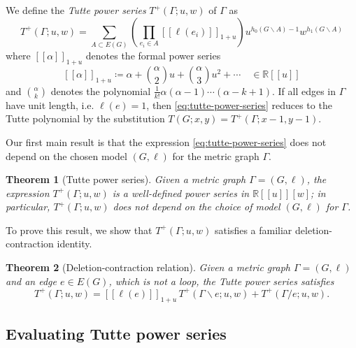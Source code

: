 \documentclass{amsart}
\newtheorem{thm}{Theorem}
\theoremstyle{definition}
\newcommand{\RR}{\mathbb{R}}
\newcommand{\fanalog}[2]{[\![#2]\!]_{#1}}
\begin{document}
We define the {\em Tutte power series}
$T^+(\Gamma; u,w)$ %
of $\Gamma$ as
\begin{equation}
\label{eq:tutte-power-series}
	T^+(\Gamma; u,w) = \sum_{A \subset E(G)} \left( \prod_{e_i \in A} \fanalog{1 + u}{\ell(e_i)} \right)
	u^{h_0(G\backslash A) - 1}w^{h_1(G\backslash A)} 
\end{equation}
where $\fanalog{1 + u}{\alpha}$ denotes the formal power series  
\begin{equation}\label{eq:f-analog}
	\fanalog{1 + u}{\alpha} \coloneq \alpha + \binom{\alpha}{2} u + \binom{\alpha}{3} u^2 + \cdots
	\quad \in \RR[[u]]
\end{equation}
and
$\binom{\alpha}{k}$ %
denotes the polynomial
$\displaystyle \frac1{k!}\alpha(\alpha - 1) \cdots (\alpha - k + 1)$.
If all edges in $\Gamma$ have unit length, i.e. $\ell(e) = 1$, then \eqref{eq:tutte-power-series} reduces to the Tutte polynomial by the substitution $T(G; x, y) = T^+(\Gamma; x - 1, y - 1)$.

Our first main result is that the expression \eqref{eq:tutte-power-series} does not depend on the chosen model $(G,\ell)$ for the metric graph $\Gamma$.
\begin{thm}[Tutte power series]
\label{thm:intro-tutte-series}
Given a metric graph $\Gamma = (G,\ell)$,
the expression $T^+(\Gamma; u,w)$
is a well-defined power series in
$\RR[\![u]\!][w]$;
in particular,
$T^+(\Gamma; u,w)$ does not depend on the choice of model $(G,\ell)$ for $\Gamma$.
\end{thm}

To prove this result, we show that $T^+(\Gamma; u, w)$ satisfies a familiar deletion-contraction identity.
\begin{thm}[Deletion-contraction relation]
\label{thm:intro-deletion-contraction}
Given a metric graph $\Gamma = (G,\ell)$ and an edge $e \in E(G)$,
which is not a loop,
the Tutte power series satisfies
\begin{equation}
	T^+(\Gamma; u,w) = \fanalog{1 + u}{\ell(e)} \, T^+(\Gamma \backslash e; u,w) + T^+(\Gamma / e; u,w).
\end{equation}
\end{thm}

\subsection{Evaluating Tutte power series}
\end{document}
